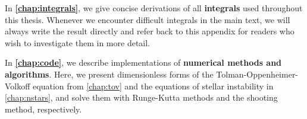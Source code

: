 In \textbf{\cref{chap:integrals}}, we give concise derivations of all \textbf{integrals} used throughout this thesis.
Whenever we encounter difficult integrals in the main text, we will always write the result directly and refer back to this appendix for readers who wish to investigate them in more detail.

In \textbf{\cref{chap:code}}, we describe implementations of \textbf{numerical methods and algorithms}.
Here, we present dimensionless forms of the Tolman-Oppenheimer-Volkoff equation from \cref{chap:tov} and the equations of stellar instability in \cref{chap:nstars}, and solve them with Runge-Kutta methods and the shooting method, respectively.
